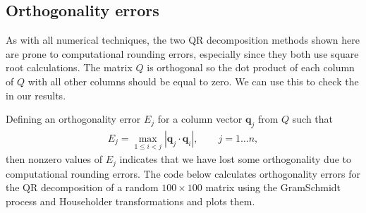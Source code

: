 \documentclass[letterpaper,10pt,english]{jupyterBook}
\begin{document}
\subsection{Orthogonality errors}
\label{\detokenize{6_Direct_methods/6.4_QR_decomposition:orthogonality-errors}}
\sphinxAtStartPar
As with all numerical techniques, the two QR decomposition methods shown here are prone to computational rounding errors, especially since they both use square root calculations. The matrix \(Q\) is orthogonal so the dot product of each column of \(Q\) with all other columns should be equal to zero. We can use this to check the  in our results.

\sphinxAtStartPar
Defining an orthogonality error \(E_j\) for a column vector \(\mathbf{q}_j\) from \(Q\) such that
\begin{align*}
    E_j =\max_{1 \leq i < j} |\mathbf{q}_j \cdot \mathbf{q}_i |, \qquad j = 1 \ldots n,
\end{align*}
\sphinxAtStartPar
then non\sphinxhyphen{}zero values of \(E_j\) indicates that we have lost some orthogonality due to computational rounding errors. The code below calculates orthogonality errors for the QR decomposition of a random \(100 \times 100\) matrix using the Gram\sphinxhyphen{}Schmidt process and Householder transformations and plots them.
\end{document}
